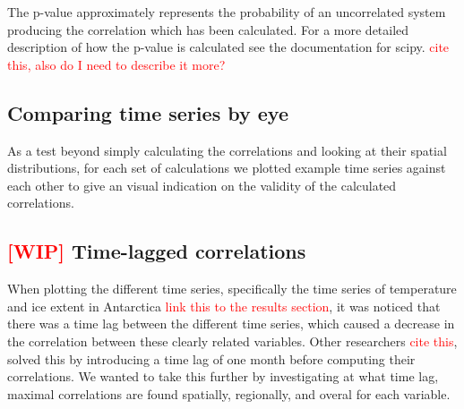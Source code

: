 The p-value approximately represents the probability of an uncorrelated system producing the correlation which has been calculated. For a more detailed description of how the p-value is calculated see the documentation for scipy. \textcolor{red}{cite this, also do I need to describe it more?}


\subsection{Comparing time series by eye}
As a test beyond simply calculating the correlations and looking at their spatial distributions, for each set of calculations we plotted example time series against each other to give an visual indication on the validity of the calculated correlations.


\subsection{\textcolor{red}{[WIP]} Time-lagged correlations}
When plotting the different time series, specifically the time series of temperature and ice extent in Antarctica \textcolor{red}{link this to the results section}, it was noticed that there was a time lag between the different time series, which caused a decrease in the correlation between these clearly related variables. Other researchers \textcolor{red}{cite this}, solved this by introducing a time lag of one month before computing their correlations. We wanted to take this further by investigating at what time lag, maximal correlations are found spatially, regionally, and overal for each variable.